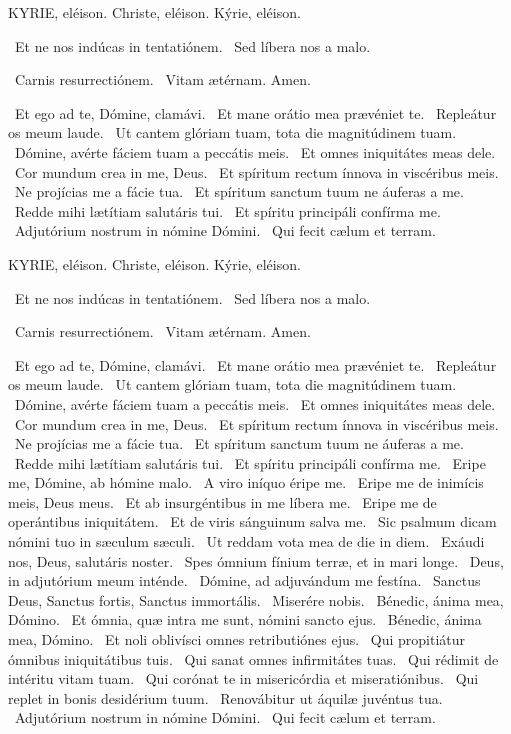 KYRIE, eléison. Christe, eléison. Kýrie, eléison.

 \V\ Et ne nos indúcas in tentatiónem. \R\ Sed líbera nos a malo.

 \V\ Carnis resurrectiónem. \R\ Vitam ætérnam. Amen.

\V\ Et ego ad te, Dómine, clamávi. \R\ Et mane orátio mea prævéniet te. \V\ Repleátur os meum laude. \R\ Ut cantem glóriam tuam, tota die magnitúdinem tuam. \V\ Dómine, avérte fáciem tuam a peccátis meis. \R\ Et omnes iniquitátes meas dele. \V\ Cor mundum crea in me, Deus. \R\ Et spíritum rectum ínnova in viscéribus meis. \V\ Ne projícias me a fácie tua. \R\ Et spíritum sanctum tuum ne áuferas a me. \V\ Redde mihi lætítiam salutáris tui. \R\ Et spíritu principáli confírma me. \V\ Adjutórium nostrum in nómine Dómini. \R\ Qui fecit cælum et terram.



KYRIE, eléison. Christe, eléison. Kýrie, eléison.

 \V\ Et ne nos indúcas in tentatiónem. \R\ Sed líbera nos a malo.

 \V\ Carnis resurrectiónem. \R\ Vitam ætérnam. Amen.

\V\ Et ego ad te, Dómine, clamávi. \R\ Et mane orátio mea prævéniet te. \V\ Repleátur os meum laude. \R\ Ut cantem glóriam tuam, tota die magnitúdinem tuam. \V\ Dómine, avérte fáciem tuam a peccátis meis. \R\ Et omnes iniquitátes meas dele. \V\ Cor mundum crea in me, Deus. \R\ Et spíritum rectum ínnova in viscéribus meis. \V\ Ne projícias me a fácie tua. \R\ Et spíritum sanctum tuum ne áuferas a me. \V\ Redde mihi lætítiam salutáris tui. \R\ Et spíritu principáli confírma me. \V\ Eripe me, Dómine, ab hómine malo. \R\ A viro iníquo éripe me. \V\ Eripe me de inimícis meis, Deus meus. \R\ Et ab insurgéntibus in me líbera me. \V\ Eripe me de operántibus iniquitátem. \R\ Et de viris sánguinum salva me. \V\ Sic psalmum dicam nómini tuo in sæculum sæculi. \R\ Ut reddam vota mea de die in diem. \V\ Exáudi nos, Deus, salutáris noster. \R\ Spes ómnium fínium terræ, et in mari longe. \V\ Deus, in adjutórium meum inténde. \R\ Dómine, ad adjuvándum me festína. \V\ Sanctus Deus, Sanctus fortis, Sanctus immortális. \R\ Miserére nobis. \V\ Bénedic, ánima mea, Dómino. \R\ Et ómnia, quæ intra me sunt, nómini sancto ejus. \V\ Bénedic, ánima mea, Dómino. \R\ Et noli oblivísci omnes retributiónes ejus. \V\ Qui propitiátur ómnibus iniquitátibus tuis. \R\ Qui sanat omnes infirmitátes tuas. \V\ Qui rédimit de intéritu vitam tuam. \R\ Qui corónat te in misericórdia et miseratiónibus. \V\ Qui replet in bonis desidérium tuum. \R\ Renovábitur ut áquilæ juvéntus tua. \V\ Adjutórium nostrum in nómine Dómini. \R\ Qui fecit cælum et terram.

